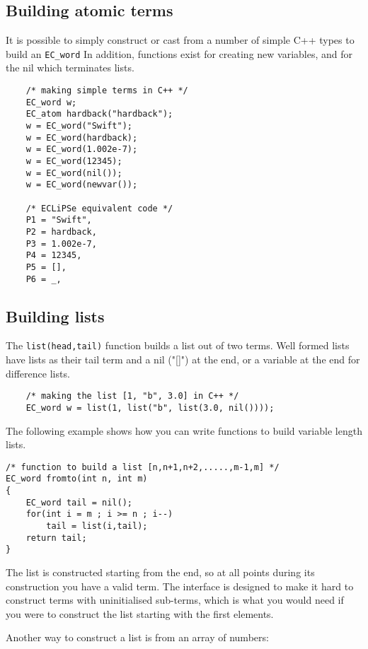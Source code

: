 \subsection{Building atomic {\eclipse} terms}
It is possible to simply construct or cast from a number of simple C++ types to
build an \verb.EC_word. In addition, functions exist for creating
new variables, and for the nil which terminates {\eclipse} lists.
\begin{verbatim}
    /* making simple terms in C++ */
    EC_word w;
    EC_atom hardback("hardback");
    w = EC_word("Swift");
    w = EC_word(hardback);
    w = EC_word(1.002e-7);
    w = EC_word(12345);
    w = EC_word(nil());
    w = EC_word(newvar());

    /* ECLiPSe equivalent code */
    P1 = "Swift",
    P2 = hardback,
    P3 = 1.002e-7,
    P4 = 12345,
    P5 = [],
    P6 = _,
\end{verbatim}

\subsection{Building {\eclipse} lists}
The \verb.list(head,tail). function builds a list out of two terms. Well
formed lists have lists as their tail term and a nil ("[]") at the end, or a
variable at the end for difference lists.

\begin{verbatim}
    /* making the list [1, "b", 3.0] in C++ */
    EC_word w = list(1, list("b", list(3.0, nil())));
\end{verbatim}

The following example shows how you can write functions to build
variable length lists.

\begin{verbatim}
/* function to build a list [n,n+1,n+2,.....,m-1,m] */
EC_word fromto(int n, int m)
{
    EC_word tail = nil();
    for(int i = m ; i >= n ; i--)
        tail = list(i,tail);
    return tail;
}
\end{verbatim}

The list is constructed starting from the end, so at all points during its
construction you have a valid term. The interface is designed to
make it hard to construct terms with uninitialised sub-terms, which is
what you would need if you were to construct the list starting with
the first elements.

Another way to construct a list is from an array of numbers:

